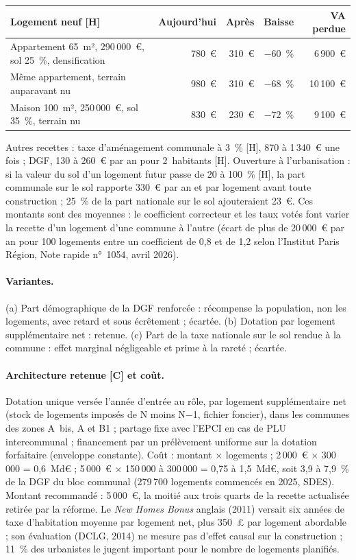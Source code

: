 \begin{center}\small\begin{tabular}{@{}lrrrr@{}}\toprule
Logement neuf [H] & Aujourd'hui & Après & Baisse & VA perdue \\\midrule
Appartement 65~m², 290\,000~€, sol 25~\%, densification & 780~€ & 310~€ & $-60$~\% & 6\,900~€ \\
Même appartement, terrain auparavant nu & 980~€ & 310~€ & $-68$~\% & 10\,100~€ \\
Maison 100~m², 250\,000~€, sol 35~\%, terrain nu & 830~€ & 230~€ & $-72$~\% & 9\,100~€ \\\bottomrule
\end{tabular}\end{center}
Autres recettes : taxe d'aménagement communale à 3~\% [H], 870 à 1\,340~€ une fois ; DGF, 130 à 260~€ par an pour
2~habitants [H]. Ouverture à l'urbanisation : si la valeur du sol d'un logement futur passe de 20 à 100~\% [H], la part
communale sur le sol rapporte 330~€ par an et par logement avant toute construction ; 25~\% de la part nationale sur le
sol ajouteraient 23~€. Ces montants sont des moyennes : le coefficient correcteur et les taux votés font varier la
recette d'un logement d'une commune à l'autre (écart de plus de 20\,000~€ par an pour 100 logements entre un
coefficient de 0,8 et de 1,2 selon l'Institut Paris Région, Note rapide n°~1054, avril 2026).

\paragraph{Variantes.} (a) Part démographique de la DGF renforcée : récompense la population, non les logements,
avec retard et sous écrêtement ; écartée. (b) Dotation par logement supplémentaire net : retenue. (c) Part de la taxe
nationale sur le sol rendue à la commune : effet marginal négligeable et prime à la rareté ; écartée.

\paragraph{Architecture retenue [C] et coût.} Dotation unique versée l'année d'entrée au rôle, par logement
supplémentaire net (stock de logements imposés de N moins N$-$1, fichier foncier), dans les communes des zones A~bis,
A et B1 ; partage fixe avec l'EPCI en cas de PLU intercommunal ; financement par un prélèvement uniforme sur la
dotation forfaitaire (enveloppe constante). Coût : montant $\times$ logements ; 2\,000~€ $\times$ 300\,000 = 0,6~Md€ ;
5\,000~€ $\times$ 150\,000 à 300\,000 = 0,75 à 1,5~Md€, soit 3,9 à 7,9~\% de la DGF du bloc communal (279\,700
logements commencés en 2025, SDES). Montant recommandé : 5\,000~€, la moitié aux trois quarts de la recette actualisée
retirée par la réforme. Le \emph{New Homes Bonus} anglais (2011) versait six années de taxe d'habitation moyenne par
logement net, plus 350~£ par logement abordable ; son évaluation (DCLG, 2014) ne mesure pas d'effet causal sur la
construction ; 11~\% des urbanistes le jugent important pour le nombre de logements planifiés.

